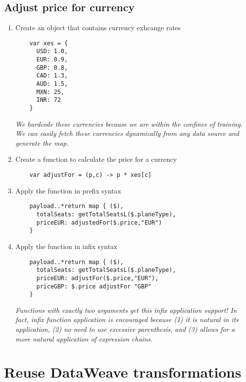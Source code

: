 \subsection{Adjust price for currency}
\begin{enumerate}[resume*]
\item Create an object that contains currency exhcange rates
  \begin{lstlisting}
    var xes = {
      USD: 1.0,
      EUR: 0.9,
      GBP: 0.8,
      CAD: 1.3,
      AUD: 1.5,
      MXN: 25,
      INR: 72
    }
  \end{lstlisting}
  \emph{
    We hardcode these currencies because we are within the confines of training.  We can easily fetch these
    currencies dynamically from any data source and generate the map.
  }
\item Create a function to calculate the price for a currency
  \begin{lstlisting}
    var adjustFor = (p,c) -> p * xes[c]
  \end{lstlisting}
\item Apply the function in prefix syntax
  \begin{lstlisting}
    payload..*return map { ($),
      totalSeats: getTotalSeatsL($.planeType),
      priceEUR: adjustedFor($.price,"EUR")
    }
  \end{lstlisting}
\item Apply the function in infix syntax
  \begin{lstlisting}
    payload..*return map { ($),
      totalSeats: getTotalSeatsL($.planeType),
      priceEUR: adjustFor($.price,"EUR"),
      priceGBP: $.price adjustFor "GBP"
    }    
  \end{lstlisting}
  \emph{
    Functions with exactly two arguments get this infix application support!  In fact, infix function
    application is encouraged because (1) it is natural in its application, (2) no need to use excessive
    parenthesis, and (3) allows for a more natural application of expression chains.
  }
\end{enumerate}

\section{Reuse DataWeave transformations}

